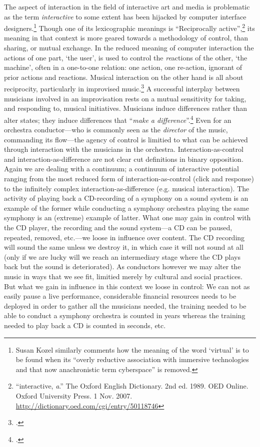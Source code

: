 The aspect of interaction in the field of interactive art and media is problematic as the term \emph{interactive} to some extent has been hijacked by computer interface designers.\footnote{Susan Kozel similarly comments how the meaning of the word `virtual' is to be found when its ``overly reductive association with immersive technologies and that now anachronistic term cyberspace'' is removed.} Though one of its lexicographic meanings is ``Reciprocally active'',\footnote{``interactive, \textit{a}.'' The Oxford English Dictionary. 2nd ed. 1989. OED Online. Oxford University Press. 1 Nov. 2007. \url{http://dictionary.oed.com/cgi/entry/50118746}} its meaning in that context is more geared towards a methodology of control, than sharing, or mutual exchange. In the reduced meaning of computer interaction the actions of one part, `the user', is used to control the \emph{re}actions of the other, `the machine', often in a one-to-one relation: one action, one re-action, ignorant of prior actions and reactions. Musical interaction on the other hand is all about reciprocity, particularly in improvised music.\footcite[See for example][]{monson96} A successful interplay between musicians involved in an improvisation rests on a mutual sensitivity for taking, and responding to, musical initiatives. Musicians induce differences rather than alter states; they induce differences that ``\emph{make a difference}''.\footcite[And, according to Gregory Bateson, a difference that makes a difference is the definition of \emph{Information}][92]{Bateson} Even for an orchestra conductor---who is commonly seen as the \emph{director} of the music, commanding its flow---the agency of control is limitied to what can be achieved through interaction with the musicians in the orchestra. Interaction-as-control and interaction-as-difference are not clear cut definitions in binary opposition. Again we are dealing with a continuum; a continuum of interactive potential ranging from the most reduced form of interaction-as-control (click and response) to the infinitely complex interaction-as-difference (e.g. musical interaction). The activity of playing back a CD-recording of a symphony on a sound system is an example of the former while conducting a symphony orchestra playing the same symphony is an (extreme) example of latter. What one may gain in control with the CD player, the recording and the sound system---a CD can be paused, repeated, removed, etc.---we loose in influence over content. The CD recording will sound the same unless we destroy it, in which case it will not sound at all (only if we are lucky will we reach an intermediary stage where the CD plays back but the sound is deteriorated). As conductors however we may alter the music in ways that we see fit, limitied merely by cultural and social practices. But what we gain in influence in this context we loose in control: We can not as easily pause a live performance, considerable financial resources needs to be deployed in order to gather all the musicians needed, the training needed to be able to conduct a symphony orchestra is counted in years whereas the training needed to play back a CD is counted in seconds, etc.

